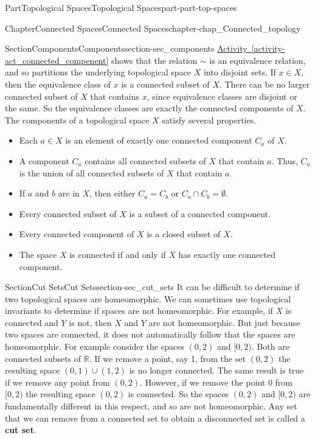\documentclass[oneside,10pt,]{book}
\newcommand{\xreffont}{\relax}
\newcommand{\terminology}[1]{\textbf{#1}}
\numberwithin{equation}{chapter}
\newcommand{\R}{\mathbb{R}}
\begin{document}
\begin{partptx}{Part}{Topological Spaces}{}{Topological Spaces}{}{}{part-part-top-spaces}
\begin{chapterptx}{Chapter}{Connected Spaces}{}{Connected Spaces}{}{}{chapter-chap_Connected_topology}
\begin{sectionptx}{Section}{Components}{}{Components}{}{}{section-sec_components}
\hyperref[activity-act_connected_compenent]{Activity~{\xreffont\ref{activity-act_connected_compenent}}} shows that the relation \(\sim\) is an equivalence relation, and so partitions the underlying topological space \(X\) into disjoint sets. If \(x \in X\), then the equivalence class of \(x\) is a connected subset of \(X\). There can be no larger connected subset of \(X\) that contains \(x\), since equivalence classes are disjoint or the same. So the equivalence classes are exactly the connected components of \(X\). The components of a topological space \(X\) satisfy several properties.%
\begin{itemize}[label=\textbullet]
\item{}Each \(a \in X\) is an element of exactly one connected component \(C_a\) of \(X\).%
\item{}A component \(C_a\) contains all connected subsets of \(X\) that contain \(a\). Thus, \(C_a\) is the union of all connected subsets of \(X\) that contain \(a\).%
\item{}If \(a\) and \(b\) are in \(X\), then either \(C_a = C_b\) or \(C_a \cap C_b = \emptyset\).%
\item{}Every connected subset of \(X\) is a subset of a connected component.%
\item{}Every connected component of \(X\) is a closed subset of \(X\).%
\item{}The space \(X\) is connected if and only if \(X\) has exactly one connected component.%
\end{itemize}
%
\end{sectionptx}
%
%
\typeout{************************************************}
\typeout{************************************************}
%
\begin{sectionptx}{Section}{Cut Sets}{}{Cut Sets}{}{}{section-sec_cut_sets}
It can be difficult to determine if two topological spaces are homeomorphic. We can sometimes use topological invariants to determine if spaces are not homeomorphic. For example, if \(X\) is connected and \(Y\) is not, then \(X\) and \(Y\) are not homeomorphic. But just because two spaces are connected, it does not automatically follow that the spaces are homeomorphic. For example consider the spaces \((0,2)\) and \([0,2)\). Both are connected subsets of \(\R\). If we remove a point, say 1, from the set \((0,2)\) the resulting space \((0,1) \cup (1,2)\) is no longer connected. The same result is true if we remove any point from \((0,2)\). However, if we remove the point \(0\) from \([0,2)\) the resulting space \((0,2)\) is connected. So the spaces \((0,2)\) and \([0,2)\) are fundamentally different in this respect, and so are not homeomorphic. Any set that we can remove from a connected set to obtain a disconnected set is called a \terminology{cut set}.%

\end{sectionptx}
\end{chapterptx}
\end{partptx}
\end{document}
